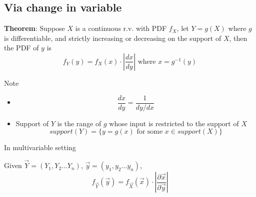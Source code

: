 \subsection{Via change in variable}
\begin{framed}
   \textbf{Theorem}: Suppose $X$ is a continuous r.v. with PDF $f_X$, let  $Y = g(X)$ where $g$ is differentiable, and strictly increasing or decreasing on the support of $X$, then the PDF of $y$ is
   \[
      f_Y(y) = f_X(x) \cdot \left| \frac{dx}{dy} \right|  \text{ where } x = g^{-1}(y)
   \] 

   Note 
   \begin{itemize}
      \item 
         \[
           \frac{dx}{dy}  = \frac{1}{dy / dx}
         \] 
      \item  Support of $Y$ is the range of $g$ whose input is restricted to the support of $X$
         \[
           support(Y) = \{ y = g(x) \text{ for some } x \in support(X) \} 
         \] 
   \end{itemize}
   
  
\end{framed}

In multivariable setting
\begin{framed}
   Given $\vec{Y} = \left( Y_1, Y_2 \hdots Y_n \right) $, $\vec{y} = (y_1, y_2 \hdots y_n)$, 
   \[
      f_{\vec{Y}}(\vec{y}) = f_{\vec{X}}(\vec{x}) \cdot \left| \frac{\partial \vec{x}}{\partial \vec{y}} \right| 
   \] 
  
\end{framed}

